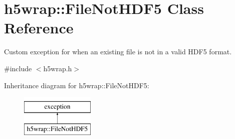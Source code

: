 \hypertarget{classh5wrap_1_1_file_not_h_d_f5}{}\section{h5wrap\+:\+:File\+Not\+H\+D\+F5 Class Reference}
\label{classh5wrap_1_1_file_not_h_d_f5}


Custom exception for when an existing file is not in a valid H\+D\+F5 format.  




{\ttfamily \#include $<$h5wrap.\+h$>$}

Inheritance diagram for h5wrap\+:\+:File\+Not\+H\+D\+F5\+:\begin{figure}[H]
\begin{center}
\leavevmode
\includegraphics[height=2.000000cm]{classh5wrap_1_1_file_not_h_d_f5}
\end{center}
\end{figure}
